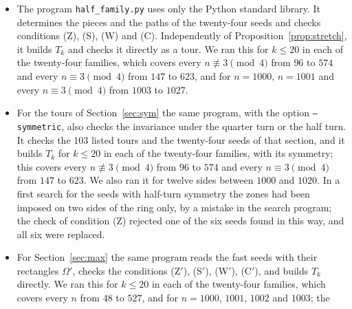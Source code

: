 \documentclass[11pt]{amsart}
\theoremstyle{remark}
\begin{document}
\begin{itemize}
Propositions~\ref{prop:small} and~\ref{prop:oddhalf} and case (c) of Theorem~\ref{thm:half}, which were added after
the fourth pass. It checked conditions (Z), (S), (W), (C) for all eighteen simple seeds, carried out the insertions of
Lemma~\ref{lem:insert} one by one for $e\le3$, and built $T_k$ directly for $k\le20$ in these eighteen families and
for $n=1000$, $1001$, $1009$ and $1521$. For odd $n\le151$ it computed the least total winding of a cycle cover; this
equals the bound of Theorem~\ref{thm:lower}(b) outside the two exceptional classes, and inside them every cover
that attains $(n-1)/2$ contains the cycle of $16$ cells from the proof of Proposition~\ref{prop:oddhalf}. It also
found by exhaustive search that no $10\times10$ tour has $5$ or $6$ coils, which supports the entry of
Table~\ref{tab:least} for $n=10$. It found no mathematical error and two misstatements, corrected here.
\item The program \texttt{half\_family.py} uses only the Python standard library. It determines the pieces and the
paths of the twenty-four seeds and checks conditions (Z), (S), (W) and (C). Independently of
Proposition~\ref{prop:stretch}, it builds $T_k$ and checks it directly as a tour. We ran this for $k\le20$ in each
of the twenty-four families, which covers every $n\not\equiv3\pmod 4$ from $96$ to $574$ and every
$n\equiv3\pmod 4$ from $147$ to $623$, and for $n=1000$, $n=1001$ and every $n\equiv3\pmod 4$ from $1003$ to $1027$.
\item For the tours of Section~\ref{sec:sym} the same program, with the option \texttt{--symmetric}, also checks
the invariance under the quarter turn or the half turn. It checks the $103$ listed tours and the twenty-four seeds of
that section, and it builds $T_k$ for $k\le20$ in each of the twenty-four families, with its symmetry; this covers
every $n\not\equiv3\pmod 4$ from $96$ to $574$ and every $n\equiv3\pmod 4$ from $147$ to $623$. We also ran it for
twelve sides between $1000$ and $1020$. In a first search for the seeds with half-turn symmetry the zones had been
imposed on two sides of the ring only, by a mistake in the search program; the check of condition (Z) rejected one
of the six seeds found in this way, and all six were replaced.
\item For Section~\ref{sec:max} the same program reads the fast seeds with their rectangles $\Omega'$, checks the
conditions (Z$'$), (S$'$), (W$'$), (C$'$), and builds $T_k$ directly. We ran this for $k\le20$ in each of the
twenty-four families, which covers every $n$ from $48$ to $527$, and for $n=1000$, $1001$, $1002$ and $1003$; the

\end{itemize}
\end{document}
